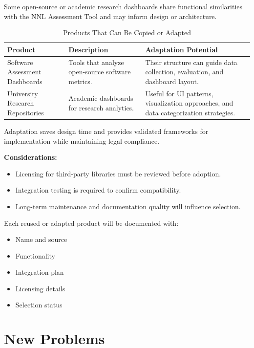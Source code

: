 \documentclass[12pt]{article}
\begin{document}
Some open-source or academic research dashboards share functional similarities with the NNL Assessment Tool and may inform design or architecture.

\begin{table}[H]
\centering
\caption{Products That Can Be Copied or Adapted}
\setlength{\tabcolsep}{4pt}
\renewcommand{\arraystretch}{1.2}
\footnotesize

\begin{tabularx}{\textwidth}{p{3cm} Y Y}
\toprule
\textbf{Product} & \textbf{Description} & \textbf{Adaptation Potential} \\
\midrule
{}
Software Assessment Dashboards &
Tools that analyze open-source software metrics. &
Their structure can guide data collection, evaluation, and dashboard layout. \\
\hline
University Research Repositories &
Academic dashboards for research analytics. &
Useful for UI patterns, visualization approaches, and data categorization strategies. \\
\bottomrule
\end{tabularx}
\end{table}


Adaptation saves design time and provides validated frameworks for implementation while maintaining legal compliance.

\textbf{Considerations:}
\begin{itemize}
    \item Licensing for third-party libraries must be reviewed before adoption.
    \item Integration testing is required to confirm compatibility.
    \item Long-term maintenance and documentation quality will influence selection.
\end{itemize}

Each reused or adapted product will be documented with:
\begin{itemize}
    \item Name and source
    \item Functionality
    \item Integration plan
    \item Licensing details
    \item Selection status
\end{itemize}


\section{New Problems}
\end{document}
